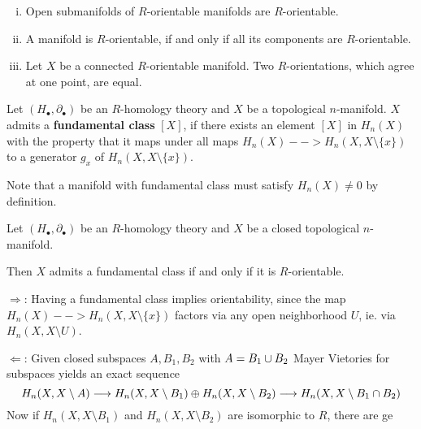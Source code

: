 	\begin{lemma}\vspace{-1.5em}
		\begin{enumerate}[(i)]
			\item{
				Open submanifolds of $R$-orientable manifolds are $R$-orientable.
			}
			\item{
				A manifold is $R$-orientable, if and only if all its components are $R$-orientable.
			}
			\item{
				Let $X$ be a connected $R$-orientable manifold. Two $R$-orientations, which agree at one point, are equal.
			}
		\end{enumerate}
	\end{lemma}

	\begin{definition}
		Let $(H_\bullet, \partial_\bullet)$ be an $R$-homology theory and $X$ be a topological $n$-manifold. $X$ admits a \textbf{fundamental class} $[X]$, if there exists an element $[X]$ in $H_n(X)$ with the property that it maps under all maps $H_n(X) --> H_n(X,X\setminus \{x\})$ to a generator $g_x$ of $H_n(X,X\setminus\{x\})$.
	\end{definition}

	Note that a manifold with fundamental class must satisfy $H_n(X) \neq 0$ by definition.

	\begin{proposition}
		Let $(H_\bullet, \partial_\bullet)$ be an $R$-homology theory and $X$ be a closed topological $n$-manifold. 

		Then $X$ admits a fundamental class if and only if it is $R$-orientable.
	\end{proposition}
	\begin{sketch}
		$\Rightarrow$: Having a fundamental class implies orientability, since the map $H_n(X) --> H_n(X,X\setminus \{x\})$ factors via any open neighborhood $U$, ie. via $H_n(X,X\setminus U)$.

		$\Leftarrow$: 
		Given closed subspaces $A,B_1,B_2$ with $A = B_1 \cup B_2$ Mayer Vietories for subspaces yields an exact sequence
		\begin{equation*}
			H_n(X,X\setminus A) \longrightarrow H_n(X,X\setminus B_1) \oplus H_n(X,X\setminus B_2) \longrightarrow H_n(X,X\setminus B_1 \cap B_2)
		\end{equation*}
		Now if $H_n(X,X\setminus B_1)$ and $H_n(X,X\setminus B_2)$ are isomorphic to $R$, there are ge
	\end{sketch}


